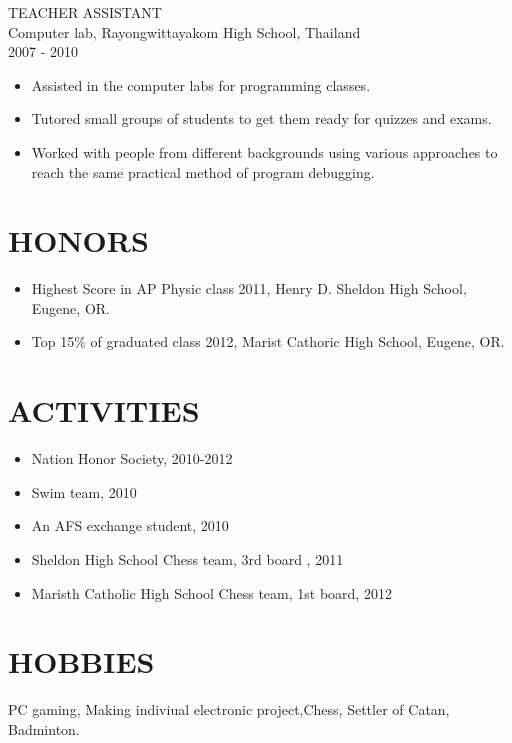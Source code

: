 \documentclass[11pt]{res} %
\begin{document}
\begin{resume}
TEACHER ASSISTANT\\
Computer lab, Rayongwittayakom High School, Thailand \\ 
2007 - 2010
\vspace{0.2in}
 \begin{itemize} \itemsep -2pt
   \item Assisted in the computer labs for programming classes.
  \item Tutored small groups of students to get them ready for quizzes and exams.
  \item Worked with people from different backgrounds using various approaches to reach the same practical method of program debugging.
\end{itemize} 

\section{HONORS} 
\begin{itemize}
\item  Highest Score in AP Physic class 2011, Henry D. Sheldon High School, Eugene, OR.
\item  Top 15\% of graduated class 2012, Marist Cathoric High School, Eugene, OR.
\end{itemize}
 
\section{ACTIVITIES} 
 \begin{itemize}
\item Nation Honor Society, 2010-2012
\item Swim team, 2010
\item An AFS exchange student, 2010
\item Sheldon High School Chess team, 3rd board , 2011
\item Maristh Catholic High School Chess team, 1st board, 2012
\end{itemize}

 
\section{HOBBIES} 
 
PC gaming, Making indiviual electronic project,Chess, Settler of Catan,  Badminton.
 

\end{resume}
\end{document}
